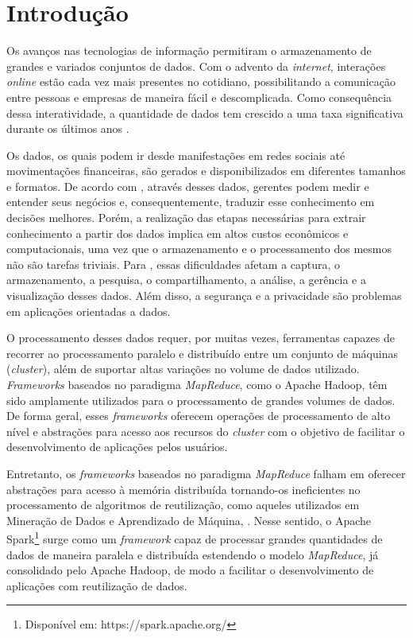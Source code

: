 \chapter{Introdução}
Os avanços nas tecnologias de informação permitiram o armazenamento de grandes e variados conjuntos de dados. Com o advento da \textit{internet}, interações \textit{online} estão cada vez mais presentes no cotidiano, possibilitando a comunicação entre pessoas e empresas de maneira fácil e descomplicada. Como consequência dessa interatividade, a quantidade de dados tem crescido a uma taxa significativa durante os últimos anos \cite{goldschmidt2015data}. 

Os dados, os quais podem ir desde manifestações em redes sociais até movimentações financeiras, são gerados e disponibilizados em diferentes tamanhos e formatos. De acordo com \cite{mcafee2012big}, através desses dados, gerentes podem medir e entender seus negócios e, consequentemente, traduzir esse conhecimento em decisões melhores. 
Porém, a realização das etapas necessárias para extrair conhecimento a partir dos dados implica em altos custos econômicos e computacionais, uma vez que o armazenamento e o processamento dos mesmos não são tarefas triviais. Para \cite{oussous2018big}, essas dificuldades afetam a captura, o armazenamento, a pesquisa, o compartilhamento, a análise, a gerência e a visualização desses dados. Além disso, a segurança e a privacidade são problemas em aplicações orientadas a dados. 

O processamento desses dados requer, por muitas vezes, ferramentas capazes de recorrer ao processamento paralelo e distribuído entre um conjunto de máquinas (\textit{cluster}), além de suportar altas variações no volume de dados utilizado. \textit{Frameworks} baseados no paradigma \textit{MapReduce}, como o Apache Hadoop, têm sido amplamente utilizados para o processamento de grandes volumes de dados. De forma geral, esses \textit{frameworks} oferecem operações de processamento de alto nível e abstrações para acesso aos recursos do \textit{cluster} com o objetivo de facilitar o desenvolvimento de aplicações pelos usuários. 

Entretanto, os \textit{frameworks} baseados no paradigma \textit{MapReduce} falham em oferecer abstrações para acesso à memória distribuída tornando-os ineficientes no processamento de algoritmos de reutilização, como aqueles utilizados em Mineração de Dados e Aprendizado de Máquina, \cite{zaharia2012rdd}. Nesse sentido, o Apache Spark\footnote{Disponível em: https://spark.apache.org/} surge como um \textit{framework} capaz de processar grandes quantidades de dados de maneira paralela e distribuída estendendo o modelo \textit{MapReduce}, já consolidado pelo Apache Hadoop, de modo a facilitar o desenvolvimento de aplicações com reutilização de dados. 

